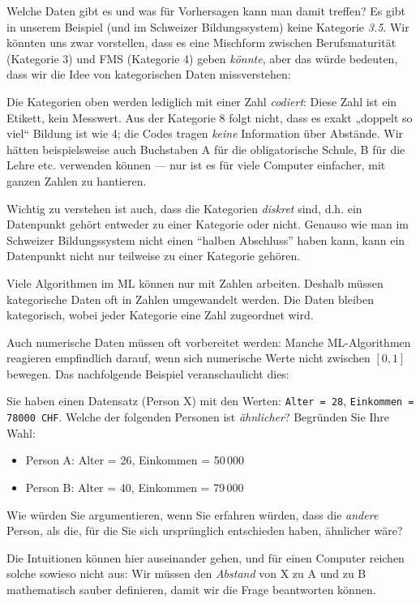 \begin{lpu}{Welche Daten gibt es und was für Vorhersagen kann man damit treffen?}
Es gibt in unserem Beispiel (und im Schweizer Bildungssystem) keine Kategorie \textit{3.5}. Wir könnten uns zwar vorstellen, dass es eine Mischform zwischen Berufsmaturität (Kategorie 3) und FMS (Kategorie 4) geben \textit{könnte}, aber das würde bedeuten, dass wir die Idee von kategorischen Daten missverstehen:

Die Kategorien oben werden lediglich mit einer Zahl \textit{codiert}: Diese Zahl ist ein Etikett, kein Messwert. Aus der Kategorie 8 folgt nicht, dass es exakt „doppelt so viel“ Bildung ist wie 4; die Codes tragen \textit{keine} Information über Abstände. Wir hätten beispielsweise auch Buchstaben A für die obligatorische Schule, B für die Lehre etc. verwenden können — nur ist es für viele Computer einfacher, mit ganzen Zahlen zu hantieren.

Wichtig zu verstehen ist auch, dass die Kategorien \textit{diskret} sind, d.h. ein Datenpunkt gehört entweder zu einer Kategorie oder nicht. Genauso wie man im Schweizer Bildungssystem nicht einen ``halben Abschluss'' haben kann, kann ein Datenpunkt nicht nur teilweise zu einer Kategorie gehören.

\begin{theorie}
Viele Algorithmen im ML k\"onnen nur mit Zahlen arbeiten. Deshalb müssen kategorische Daten oft in Zahlen umgewandelt werden. Die Daten bleiben kategorisch, wobei jeder Kategorie eine Zahl zugeordnet wird.
\end{theorie}

Auch numerische Daten m\"ussen oft vorbereitet werden: Manche ML-Algorithmen reagieren empfindlich darauf, wenn sich numerische Werte nicht zwischen $[0,1]$ bewegen. Das nachfolgende Beispiel veranschaulicht dies:

\begin{aufgabe}{3}
Sie haben einen Datensatz (Person X) mit den Werten: \texttt{Alter = 28}, \texttt{Einkommen = 78000 CHF}. Welche der folgenden Personen ist \textit{ähnlicher}? Begründen Sie Ihre Wahl:
\begin{itemize}
  \item Person A: Alter = 26, Einkommen = 50\,000
  \item Person B: Alter = 40, Einkommen = 79\,000
\end{itemize}
Wie würden Sie argumentieren, wenn Sie erfahren würden, dass die \textit{andere} Person, als die, für die Sie sich ursprünglich entschieden haben, ähnlicher wäre?
\end{aufgabe}

Die Intuitionen können hier auseinander gehen, und für einen Computer reichen solche sowieso nicht aus: Wir müssen den \textit{Abstand} von X zu A und zu B mathematisch sauber definieren, damit wir die Frage beantworten können.


\end{lpu}
